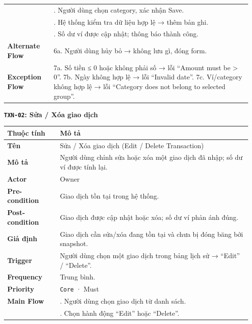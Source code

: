 \documentclass[11pt,a4paper]{article}
\newcounter{none}
\begin{document}
{\begin{longtable}[]{@{}
  >{\raggedright\arraybackslash}p{}
  >{\raggedright\arraybackslash}p{}@{}}
&6. Người dùng chọn category, xác nhận Save.\\
&7. Hệ thống kiểm tra dữ liệu hợp lệ → thêm bản ghi.\\
&8. Số dư ví được cập nhật; thông báo thành công. \\ 
\textbf{Alternate Flow} & 6a. Người dùng hủy bỏ → không lưu gì, đóng form. \\ 
\textbf{Exception Flow} & 7a. Số tiền ≤ 0 hoặc không phải số → lỗi ``Amount must be > 0''. 7b. Ngày không hợp lệ → lỗi ``Invalid date''. 7c. Ví/category không hợp lệ → lỗi ``Category does not belong to selected group''. \\
\end{longtable}
}

\textbf{\texttt{TXN-02}: Sửa / Xóa giao dịch}

{\def\LTcaptype{none}
\begin{longtable}[]{@{}
  >{\raggedright\arraybackslash}p{}
  >{\raggedright\arraybackslash}p{}@{}}
\toprule\noalign{}
\begin{minipage}[b]{\linewidth}\raggedright
Thuộc tính
\end{minipage} & \begin{minipage}[b]{\linewidth}\raggedright
Mô tả
\end{minipage} \\
\midrule\noalign{}
\endhead
\bottomrule\noalign{}
\endlastfoot
\textbf{Tên} & Sửa / Xóa giao dịch (Edit / Delete Transaction) \\ 
\textbf{Mô tả} & Người dùng chỉnh sửa hoặc xóa một giao dịch đã nhập; số dư ví được tính lại. \\ 
\textbf{Actor} & Owner \\ 
\textbf{Pre-condition} & Giao dịch tồn tại trong hệ thống. \\ 
\textbf{Post-condition} & Giao dịch được cập nhật hoặc xóa; số dư ví phản ánh đúng. \\ 
\textbf{Giả định} & Giao dịch cần sửa/xóa đang tồn tại và chưa bị đóng băng bởi snapshot. \\ 
\textbf{Trigger} & Người dùng chọn một giao dịch trong bảng lịch sử → ``Edit'' / ``Delete''. \\ 
\textbf{Frequency} & Trung bình. \\ 
\textbf{Priority} & \texttt{Core} · Must \\ 
\textbf{Main Flow} & 1. Người dùng chọn giao dịch từ danh sách.\\ 
&2. Chọn hành động ``Edit'' hoặc ``Delete''.\\

\end{longtable}}
\end{document}
